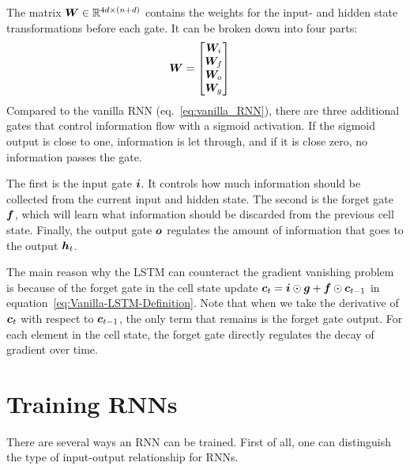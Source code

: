 		The matrix $\bm{W} \in \mathbb{R}^{4d \times (n + d)}$ contains the weights for the input- and hidden state transformations before each gate.
		It can be broken down into four parts:
		\begin{align}
			\bm{W} &=
			\begin{bmatrix}
				\bm{W}_i \\ 
				\bm{W}_f \\ 
				\bm{W}_o \\ 
				\bm{W}_g
			\end{bmatrix}
		\end{align}
		Compared to the vanilla RNN (eq.\@~\ref{eq:vanilla_RNN}), there are three additional gates that control information flow with a sigmoid activation.
		If the sigmoid output is close to one, information is let through, and if it is close zero, no information passes the gate. 
		
		The first is the input gate $\bm{i}$.
		It controls how much information should be collected from the current input and hidden state.
		The second is the forget gate $\bm{f}$, which will learn what information should be discarded from the previous cell state.
		Finally, the output gate $\bm{o}$ regulates the amount of information that goes to the output $\bm{h}_t$.
		
		The main reason why the LSTM can counteract the gradient vanishing problem is because of the forget gate in the cell state update 
		$\bm{c}_t = \bm{i} \odot \bm{g} + \bm{f} \odot \bm{c}_{t-1}$ 
		in equation~\ref{eq:Vanilla-LSTM-Definition}.
		Note that when we take the derivative of $\bm{c}_t$ with respect to $\bm{c}_{t-1}$, the only term that remains is the forget gate output.
		For each element in the cell state, the forget gate directly regulates the decay of gradient over time.
		
	\section{Training RNNs}
		
		
		There are several ways an RNN can be trained.
		First of all, one can distinguish the type of input-output relationship for RNNs.
		
